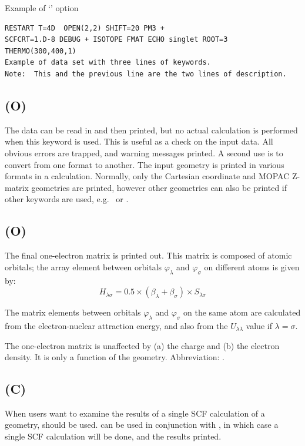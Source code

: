 Example of `\comp{+}' option

\begin{verbatim}
RESTART T=4D  OPEN(2,2) SHIFT=20 PM3 +
SCFCRT=1.D-8 DEBUG + ISOTOPE FMAT ECHO singlet ROOT=3
THERMO(300,400,1)
Example of data set with three lines of keywords.
Note:  This and the previous line are the two lines of description.
\end{verbatim}

\subsection*{ (O)}
The data can be read in and then printed, but  no  actual  calculation  is
performed  when  this  keyword is used.  This is useful as a check on the input
data.   All  obvious  errors  are  trapped,  and  warning  messages
printed.
A second use is to convert from one format to  another.   The  input
geometry  is printed in various formats in a  calculation.
Normally, only the  Cartesian coordinate and MOPAC Z-matrix geometries are
printed, however other geometries can also be printed if other keywords are
used, e.g.\   or .

\subsection*{ (O)}
The final one-electron  matrix  is  printed  out. This  matrix  is composed
of  atomic orbitals; the array element between orbitals $\varphi_{\lambda}$ and
$\varphi_{\sigma}$ on different atoms is given by: $$ H_{\lambda\sigma} = 0.5
\times (\beta_\lambda + \beta_\sigma) \times S_{\lambda\sigma}$$

The matrix elements between orbitals $\varphi_{\lambda}$ and
$\varphi_{\sigma}$  on the  same  atom  are calculated from the
electron-nuclear attraction energy, and also from the $U_{\lambda\lambda}$
value if $\lambda=\sigma$.

The one-electron matrix is unaffected by (a) the charge and (b)  the electron
density.  It is only a function of the geometry.  Abbreviation: .

\subsection*{ (C)}
When users want to examine the results of a single  SCF  calculation of a
geometry,  should be used.   can be used in conjunction
with , in which case a single SCF calculation will  be  done,
and  the results printed.

